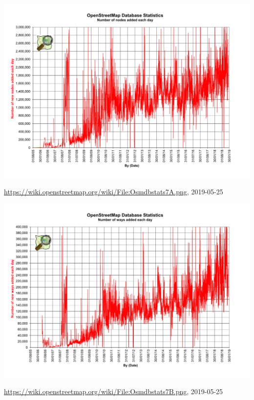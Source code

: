 \documentclass{beamer}
\begin{document}
	\begin{frame}
		\begin{center}
			\includegraphics[width=\textwidth,height=\textheight,keepaspectratio]{images/Osmdbstats7A.png}
		\end{center}
		{\tiny \url{https://wiki.openstreetmap.org/wiki/File:Osmdbstats7A.png}, 2019-05-25}
	\end{frame}
	
	\begin{frame}
		\begin{center}
			\includegraphics[width=\textwidth,height=\textheight,keepaspectratio]{images/Osmdbstats7B.png}
		\end{center}
		{\tiny \url{https://wiki.openstreetmap.org/wiki/File:Osmdbstats7B.png}, 2019-05-25}
	\end{frame}
\end{document}
